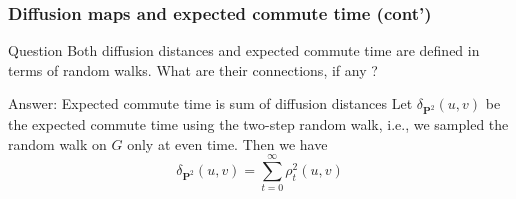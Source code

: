 \documentclass[professionalfonts, hyperref={pdfpagelabels=false,
  colorlinks=true, linkcolor=purple}]{beamer}
\begin{document}
\begin{frame}
  \frametitle{Diffusion maps and expected commute time (cont')}
    \begin{alertblock}{Question}
      Both diffusion distances and expected commute time are
      defined in terms of random walks. What are their connections, if
      any ?
    \end{alertblock}
    \begin{exampleblock}{Answer: Expected commute time is sum of diffusion
        distances}
      Let $\delta_{\bm{P}^{2}}(u,v)$ be the expected commute time using
      the two-step random walk, i.e., we sampled the random walk on $G$
      only at even time. Then we have
      \begin{equation}
        \label{eq:15}
        \delta_{\bm{P}^{2}}(u,v) = \sum_{t =
          0}^{\infty}{\rho_{t}^{2}(u,v)}
      \end{equation}
    \end{exampleblock}
\end{frame}
\end{document}
